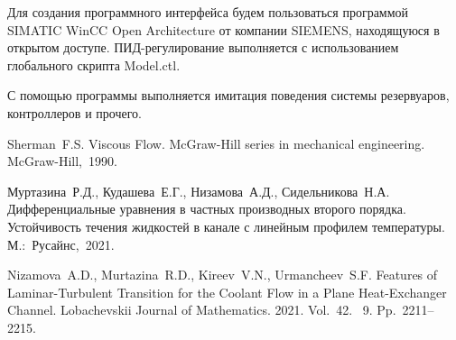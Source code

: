 Для создания программного интерфейса будем пользоваться программой SIMATIC WinCC Open Architecture от компании SIEMENS, находящуюся в открытом доступе. ПИД-регулирование выполняется с использованием глобального скрипта Model.ctl.

С помощью программы выполняется имитация поведения системы резервуаров, контроллеров и прочего.

\begin{thebibliography}{9} %

 Sherman~F.S. Viscous Flow. McGraw-Hill series in mechanical engineering. McGraw-Hill,~1990.

	Муртазина~Р.Д., Кудашева~Е.Г., Низамова~А.Д., Сидельникова~Н.А. Дифференциальные уравнения в частных производных второго порядка. Устойчивость течения жидкостей в канале с линейным профилем температуры. М.:~Русайнс,~2021.


	Nizamova~A.D., Murtazina~R.D., Kireev~V.N., Urmancheev~S.F. Features of Laminar-Turbulent Transition for the Coolant Flow in a Plane Heat-Exchanger Channel. Lobachevskii Journal of Mathematics. 2021. Vol.~42. \textnumero~9. Pp.~2211--2215.


\end{thebibliography}




%

